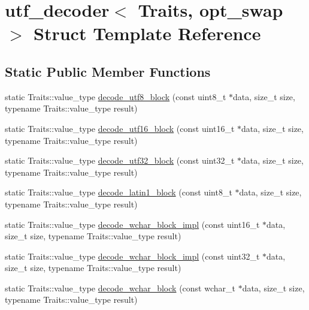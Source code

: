 \hypertarget{structutf__decoder}{\section{utf\-\_\-decoder$<$ Traits, opt\-\_\-swap $>$ Struct Template Reference}
\label{structutf__decoder}
}
\subsection*{Static Public Member Functions}
\begin{DoxyCompactItemize}
\item 
static Traits\-::value\-\_\-type \hyperlink{structutf__decoder_a671829bbdba1eac5c8bd2bf781eae498}{decode\-\_\-utf8\-\_\-block} (const uint8\-\_\-t $\ast$data, size\-\_\-t size, typename Traits\-::value\-\_\-type result)
\item 
static Traits\-::value\-\_\-type \hyperlink{structutf__decoder_ac22afd983ac79318f0e7d07669bda8d1}{decode\-\_\-utf16\-\_\-block} (const uint16\-\_\-t $\ast$data, size\-\_\-t size, typename Traits\-::value\-\_\-type result)
\item 
static Traits\-::value\-\_\-type \hyperlink{structutf__decoder_a8bed41cc707328e8d8ab91fd7c3c943e}{decode\-\_\-utf32\-\_\-block} (const uint32\-\_\-t $\ast$data, size\-\_\-t size, typename Traits\-::value\-\_\-type result)
\item 
static Traits\-::value\-\_\-type \hyperlink{structutf__decoder_a3f728755fa7cc552e30e8d8776cad1ce}{decode\-\_\-latin1\-\_\-block} (const uint8\-\_\-t $\ast$data, size\-\_\-t size, typename Traits\-::value\-\_\-type result)
\item 
static Traits\-::value\-\_\-type \hyperlink{structutf__decoder_a56b161067860fde1ed534ac3b7399e36}{decode\-\_\-wchar\-\_\-block\-\_\-impl} (const uint16\-\_\-t $\ast$data, size\-\_\-t size, typename Traits\-::value\-\_\-type result)
\item 
static Traits\-::value\-\_\-type \hyperlink{structutf__decoder_a3bd423d3ce99b245c76be8a0796d951b}{decode\-\_\-wchar\-\_\-block\-\_\-impl} (const uint32\-\_\-t $\ast$data, size\-\_\-t size, typename Traits\-::value\-\_\-type result)
\item 
static Traits\-::value\-\_\-type \hyperlink{structutf__decoder_a5953fd0661c64408e08161342e4c538d}{decode\-\_\-wchar\-\_\-block} (const wchar\-\_\-t $\ast$data, size\-\_\-t size, typename Traits\-::value\-\_\-type result)
\end{DoxyCompactItemize}


